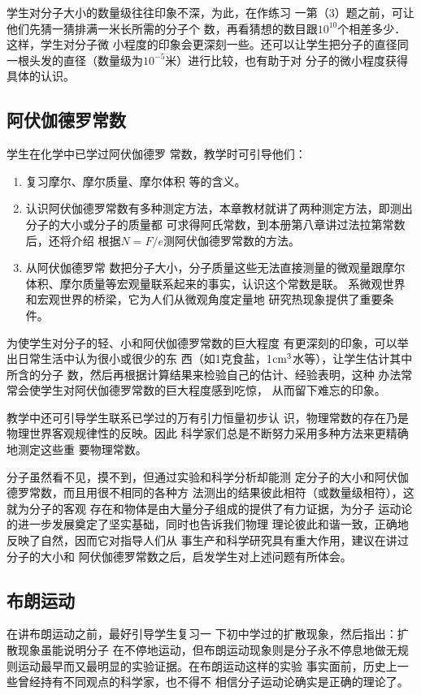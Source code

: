 学生对分子大小的数量级往往印象不深，为此，在作练习
一第（3）题之前，可让他们先猜一猜排满一米长所需的分子个
数，再看猜想的数目跟$10^{10}$个相差多少．这样，学生对分子微
小程度的印象会更深刻一些。还可以让学生把分子的直径同
一根头发的直径（数量级为$10^{-5}$米）进行比较，也有助于对
分子的微小程度获得具体的认识。

\subsection{阿伏伽德罗常数}
 学生在化学中已学过阿伏伽德罗
常数，教学时可引导他们：
\begin{enumerate}
\item 复习摩尔、摩尔质量、摩尔体积
等的含义。
\item 认识阿伏伽德罗常数有多种测定方法，本章教材就讲了两种测定方法，即测出分子的大小或分子的质量都
可求得阿氏常数，到本册第八章讲过法拉第常数后，还将介绍
根据$N=F/e$测阿伏伽德罗常数的方法。\item 从阿伏伽德罗常
数把分子大小，分子质量这些无法直接测量的微观量跟摩尔
体积、摩尔质量等宏观量联系起来的事实，认识这个常数是联。
系微观世界和宏观世界的桥梁，它为人们从微观角度定量地
研究热现象提供了重要条件。
\end{enumerate}

为使学生对分子的轻、小和阿伏伽德罗常数的巨大程度
有更深刻的印象，可以举出日常生活中认为很小或很少的东
西（如1克食盐，1${\rm cm}^3$水等），让学生估计其中所含的分子
数，然后再根据计算结果来检验自己的估计、经验表明，这种
办法常常会使学生对阿伏伽德罗常数的巨大程度感到吃惊，
从而留下难忘的印象。

教学中还可引导学生联系已学过的万有引力恒量初步认
识，物理常数的存在乃是物理世界客观规律性的反映。因此
科学家们总是不断努力采用多种方法来更精确地测定这些重
要物理常数。

分子虽然看不见，摸不到，但通过实验和科学分析却能测
定分子的大小和阿伏伽德罗常数，而且用很不相同的各种方
法测出的结果彼此相符（或数量级相符），这就为分子的客观
存在和物体是由大量分子组成的提供了有力证据，为分子
运动论的进一步发展奠定了坚实基础，同时也告诉我们物理
理论彼此和谐一致，正确地反映了自然，因而它对指导人们从
事生产和科学研究具有重大作用，建议在讲过分子的大小和
阿伏伽德罗常数之后，启发学生对上述问题有所体会。

\subsection{布朗运动}
 在讲布朗运动之前，最好引导学生复习一
下初中学过的扩散现象，然后指出：扩散现象虽能说明分子
在不停地运动，但布朗运动现象则是分子永不停息地做无规
则运动最早而又最明显的实验证据。在布朗运动这样的实验
事实面前，历史上一些曾经持有不同观点的科学家，也不得不
相信分子运动论确实是正确的理论了。

